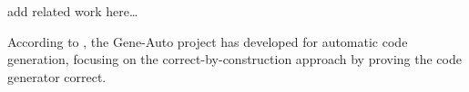 add related work here\ldots

According to \cite{AlvarezCabrera2010}, the Gene-Auto project \cite{Toom2010} has developed for automatic code generation, focusing on the correct-by-construction approach by proving the code generator correct.
